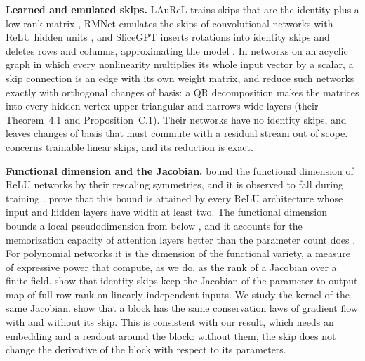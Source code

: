 \documentclass[10pt]{article}
\theoremstyle{definition}
\theoremstyle{remark}
\newcommand{\para}[1]{\smallskip\noindent\textbf{#1}\hspace{0.5em}}
\begin{document}
\para{Learned and emulated skips.} LAuReL trains skips that are the identity plus a low-rank matrix \citep{menghani2024laurel}, RMNet emulates the skips of convolutional networks with ReLU hidden units \citep{meng2021rmnet}, and SliceGPT inserts rotations into identity skips and deletes rows and columns, approximating the model \citep[Sections~3.3 and~3.4]{ashkboos2024slicegpt}. In networks on an acyclic graph in which every nonlinearity multiplies its whole input vector by a scalar, a skip connection is an edge with its own weight matrix, and \citet{ganev2022quiver} reduce such networks exactly with orthogonal changes of basis: a QR decomposition makes the matrices into every hidden vertex upper triangular and narrows wide layers (their Theorem~4.1 and Proposition~C.1). Their networks have no identity skips, and \citet{bird2026isotropic} leaves changes of basis that must commute with a residual stream out of scope.  concerns trainable linear skips, and its reduction is exact.

\para{Functional dimension and the Jacobian.} \citet{grigsby2022functional} bound the functional dimension of ReLU networks by their rescaling symmetries, and it is observed to fall during training \citep{bonapellissier2024geometry}. \citet{grillo2026most} prove that this bound is attained by every ReLU architecture whose input and hidden layers have width at least two. The functional dimension bounds a local pseudodimension from below \citep{grigsby2024persistent}, and it accounts for the memorization capacity of attention layers better than the parameter count does \citep{henry2026generic}. For polynomial networks it is the dimension of the functional variety, a measure of expressive power that \citet{kileel2019expressive} compute, as we do, as the rank of a Jacobian over a finite field. \citet{macdonald2023skip} show that identity skips keep the Jacobian of the parameter-to-output map of full row rank on linearly independent inputs. We study the kernel of the same Jacobian. \citet{marcotte2025resnets} show that a block has the same conservation laws of gradient flow with and without its skip. This is consistent with our result, which needs an embedding and a readout around the block: without them, the skip does not change the derivative of the block with respect to its parameters.
\end{document}
